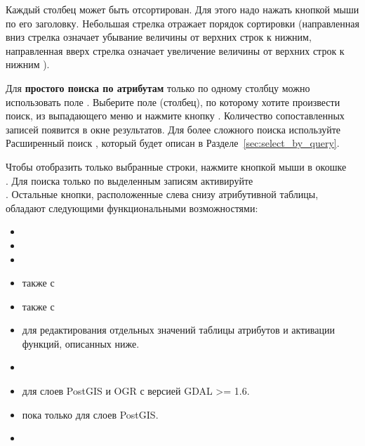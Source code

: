 Каждый столбец может быть отсортирован. Для этого надо нажать кнопкой мыши
по его заголовку. Небольшая стрелка отражает порядок сортировки (направленная
вниз стрелка означает убывание величины от верхних строк к нижним,
направленная вверх стрелка означает увеличение величины от верхних строк
к нижним ).

Для \textbf{простого поиска по атрибутам} только по одному столбцу можно
использовать поле . Выберите поле (столбец), по которому
хотите произвести поиск, из выпадающего меню и нажмите кнопку .
Количество сопоставленных записей появится в окне результатов. Для более
сложного поиска используйте Расширенный поиск , который будет
описан в Разделе~\ref{sec:select_by_query}.

Чтобы отобразить только выбранные строки, нажмите кнопкой мыши в окошке \\
. Для поиска только по выделенным
записям активируйте \\
. Остальные
кнопки, расположенные слева снизу атрибутивной таблицы, обладают следующими
функциональными возможностями:

\begin{itemize}[label=--]
\item {}
\item {}
\item {}
\item {}
также с 
\item {}
также с 
\item {} для
редактирования отдельных значений таблицы атрибутов и активации функций,
описанных ниже.
\item {}
\item {} для слоев PostGIS
и OGR с версией GDAL >= 1.6.
\item {} пока только для
слоев PostGIS.
\item {}
\end{itemize}

